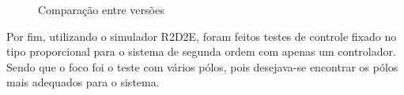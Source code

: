\documentclass[a4paper,12pt]{article}
\begin{document}
\begin{figure}[H]
     \centering
\hspace{1cm}
     
     \caption{Comparação entre versões}
     \label{fig:interface-in}
\end{figure}

\hspace{4ex}Por fim, utilizando o simulador R2D2E, foram feitos testes de controle fixado no tipo proporcional para o sistema de segunda ordem com apenas um controlador. Sendo que o foco foi o teste com vários pólos, pois desejava-se encontrar os pólos mais adequados para o sistema. 




\newpage


\thispagestyle{main}
\end{document}
